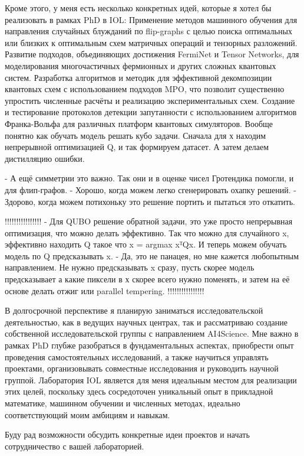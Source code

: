 Кроме этого, у меня есть несколько конкретных идей, которые я хотел бы реализовать в рамках PhD в IOL:
Применение методов машинного обучения для направления случайных блужданий по flip-graphs с целью поиска оптимальных или близких к оптимальным схем матричных операций и тензорных разложений.
Развитие подходов, объединяющих достижения FermiNet и Tensor Networks, для моделирования многочастичных фермионных и других сложных квантовых систем.
Разработка алгоритмов и методик для эффективной декомпозиции квантовых схем с использованием подходов MPO, что позволит существенно упростить численные расчёты и реализацию экспериментальных схем.
Создание и тестирование протоколов детекции запутанности с использованием алгоритмов Франка-Вольфа для различных платформ квантовых симуляторов.
Вообще понятно как обучать модель решать кубо задачи. Сначала для х находим непрерывной оптимизацией Q, и так формируем датасет. А затем делаем дистилляцию ошибки. 

- А ещё симметрии это важно. Так они и в оценке чисел Гротендика помогли, и для флип-графов. 
- Хорошо, когда можем легко сгенерировать охапку решений. 
- Здорово, когда можем потихоньку это решение портить и пытаться это откатить.

!!!!!!!!!!!!!!!!
- Для QUBO решение обратной задачи, это уже просто непрерывная оптимизация, что можно делать эффективно. Так что можно для случайного x, эффективно находить Q такое что x = argmax xᵀQx. И теперь можем обучать модель по Q предсказывать x.  
- Да, это не панацея, но мне кажется любопытным направлением. Не нужно предсказывать x сразу, пусть скорее модель предсказывает а какие пиксели в х скорее всего нужно поменять, и затем на её основе делать отжиг или parallel tempering. 
!!!!!!!!!!!!!!!!

В долгосрочной перспективе я планирую заниматься исследовательской деятельностью, как в ведущих научных центрах, так и рассматриваю создание собственной исследовательской группы с направлением AI4Science. Мне важно в рамках PhD глубже разобраться в фундаментальных аспектах, приобрести опыт проведения самостоятельных исследований, а также научиться управлять проектами, организовывать совместные исследования и руководить научной группой. Лаборатория IOL является для меня идеальным местом для реализации этих целей, поскольку здесь сосредоточен уникальный опыт в прикладной математике, машинном обучении и численных методах, идеально соответствующий моим амбициям и навыкам.

Буду рад возможности обсудить конкретные идеи проектов и начать сотрудничество с вашей лабораторией.




